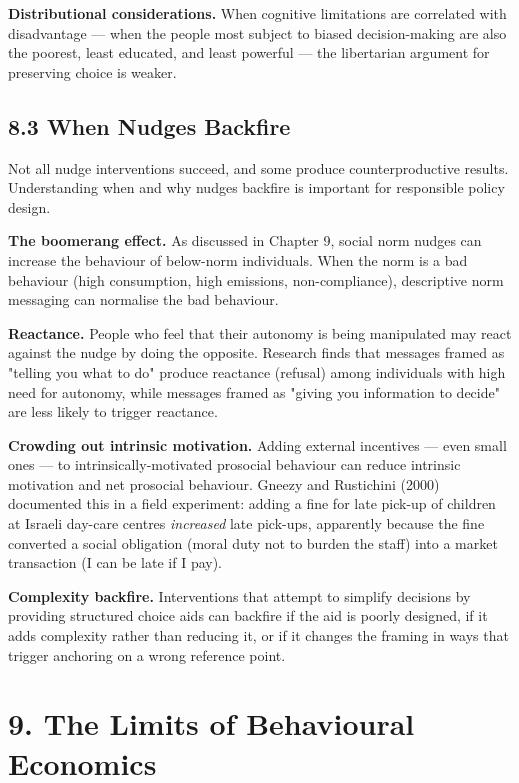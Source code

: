\documentclass[12pt, letterpaper]{article}
\begin{document}
\textbf{Distributional considerations.} When cognitive limitations are correlated with disadvantage --- when the people most subject to biased decision-making are also the poorest, least educated, and least powerful --- the libertarian argument for preserving choice is weaker.


\subsection{8.3 When Nudges Backfire}


Not all nudge interventions succeed, and some produce counterproductive results. Understanding when and why nudges backfire is important for responsible policy design.

\textbf{The boomerang effect.} As discussed in Chapter 9, social norm nudges can increase the behaviour of below-norm individuals. When the norm is a bad behaviour (high consumption, high emissions, non-compliance), descriptive norm messaging can normalise the bad behaviour.

\textbf{Reactance.} People who feel that their autonomy is being manipulated may react against the nudge by doing the opposite. Research finds that messages framed as "telling you what to do" produce reactance (refusal) among individuals with high need for autonomy, while messages framed as "giving you information to decide" are less likely to trigger reactance.

\textbf{Crowding out intrinsic motivation.} Adding external incentives --- even small ones --- to intrinsically-motivated prosocial behaviour can reduce intrinsic motivation and net prosocial behaviour. Gneezy and Rustichini (2000) documented this in a field experiment: adding a fine for late pick-up of children at Israeli day-care centres \textit{increased} late pick-ups, apparently because the fine converted a social obligation (moral duty not to burden the staff) into a market transaction (I can be late if I pay).

\textbf{Complexity backfire.} Interventions that attempt to simplify decisions by providing structured choice aids can backfire if the aid is poorly designed, if it adds complexity rather than reducing it, or if it changes the framing in ways that trigger anchoring on a wrong reference point.

\medskip


\section{9. The Limits of Behavioural Economics}
\end{document}
